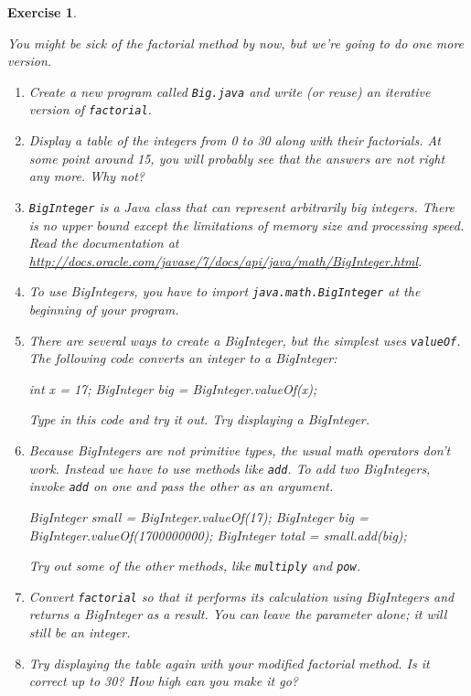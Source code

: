 \documentclass[12pt]{book}
\theoremstyle{exercise}
\newtheorem{exercise}{Exercise}[chapter]
\newcommand{\java}[1]{\verb"#1"}
\begin{document}
\begin{exercise}
\label{ex.biginteger}

You might be sick of the factorial method by now, but we're going to do one more version.

\begin{enumerate}

\item Create a new program called \java{Big.java} and write (or reuse) an iterative version of \java{factorial}.

\item Display a table of the integers from 0 to 30 along with their factorials.
At some point around 15, you will probably see that the answers are not right any more.
Why not?


\item \java{BigInteger} is a Java class that can represent arbitrarily big integers.
There is no upper bound except the limitations of memory size and processing speed.
Read the documentation at \url{http://docs.oracle.com/javase/7/docs/api/java/math/BigInteger.html}.

\item To use BigIntegers, you have to import \java{java.math.BigInteger} at the beginning of your program.

\item There are several ways to create a BigInteger, but the simplest uses \java{valueOf}.
The following code converts an integer to a BigInteger:

\begin{code}
    int x = 17;
    BigInteger big = BigInteger.valueOf(x);
\end{code}

Type in this code and try it out.
Try displaying a BigInteger.

\item Because BigIntegers are not primitive types, the usual math operators don't work.
Instead we have to use methods like \java{add}.
To add two BigIntegers, invoke \java{add} on one and pass the other as an argument.

\begin{code}
    BigInteger small = BigInteger.valueOf(17);
    BigInteger big = BigInteger.valueOf(1700000000);
    BigInteger total = small.add(big);
\end{code}

Try out some of the other methods, like \java{multiply} and \java{pow}.

\item Convert \java{factorial} so that it performs its calculation using BigIntegers and returns a BigInteger as a result.
You can leave the parameter alone; it will still be an integer.

\item Try displaying the table again with your modified factorial method.
Is it correct up to 30?
How high can you make it go?

\end{enumerate}
\end{exercise}
\end{document}
